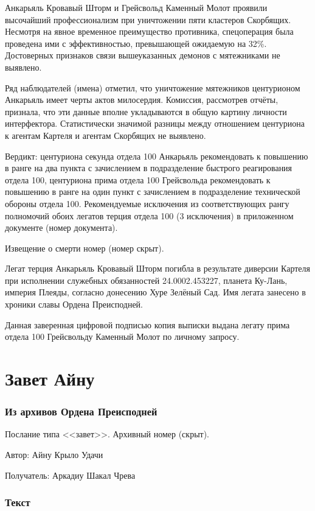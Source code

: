 \documentclass[a4paper,10pt]{book}
\begin{document}
Анкарьяль Кровавый Шторм и Грейсвольд Каменный Молот проявили высочайший 
профессионализм при уничтожении пяти кластеров Скорбящих. Несмотря на явное 
временное преимущество противника, спецоперация была проведена ими с 
эффективностью, превышающей ожидаемую на 32\%. Достоверных признаков связи 
вышеуказанных демонов с мятежниками не выявлено.

Ряд наблюдателей (имена) отметил, что уничтожение мятежников центурионом 
Анкарьяль имеет черты актов милосердия. Комиссия, рассмотрев отчёты, признала, 
что эти данные вполне укладываются в общую картину личности интерфектора. 
Статистически значимой разницы между отношением центуриона к агентам Картеля и 
агентам Скорбящих не выявлено.

Вердикт: центуриона секунда отдела 100 Анкарьяль рекомендовать к повышению в 
ранге на два пункта с зачислением в подразделение быстрого реагирования отдела 
100, центуриона прима отдела 100 Грейсвольда рекомендовать к повышению в ранге 
на один пункт с зачислением в подразделение технической обороны отдела 100. 
Рекомендуемые исключения из соответствующих рангу полномочий обоих легатов 
терция отдела 100 (3 исключения) в приложенном документе (номер документа).

Извещение о смерти номер (номер скрыт).

Легат терция Анкарьяль Кровавый Шторм погибла в результате диверсии Картеля при 
исполнении служебных обязанностей 24.0002.453227, планета Ку-Лань, империя 
Плеяды, согласно донесению Хуре Зелёный Сад. Имя легата занесено в хроники 
славы Ордена Преисподней.

Данная заверенная цифровой подписью копия выписки выдана легату прима отдела 
100 Грейсвольду Каменный Молот по личному запросу.

\section{Завет Айну}

\subsubsection{Из архивов Ордена Преисподней}

Послание типа <<завет>>. Архивный номер (скрыт).

Автор: Айну Крыло Удачи

Получатель: Аркадиу Шакал Чрева

\subsubsection{Текст}
\end{document}
